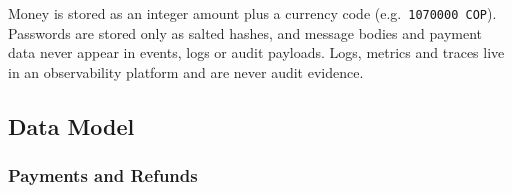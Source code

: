 Money is stored as an integer amount plus a currency code (e.g.\
\texttt{1070000 COP}). Passwords are stored only as salted hashes, and message
bodies and payment data never appear in events, logs or audit payloads. Logs,
metrics and traces live in an observability platform and are never audit
evidence.

\subsection{Data Model}

\begingroup
\setlength{\emergencystretch}{3em}
\subsubsection{Payments and Refunds}
\label{sec:pay-model}

